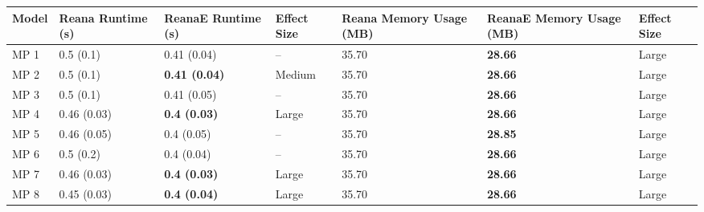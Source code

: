 \begin{tabular}{lllllll}
\toprule
Model & Reana Runtime (s) &    ReanaE Runtime (s) & Effect Size & Reana Memory Usage (MB) & ReanaE Memory Usage (MB) & Effect Size \\
\midrule
 MP 1 &         0.5 (0.1) &           0.41 (0.04) &          -- &                   35.70 &           \textbf{28.66} &       Large \\
 MP 2 &         0.5 (0.1) &  \textbf{0.41 (0.04)} &      Medium &                   35.70 &           \textbf{28.66} &       Large \\
 MP 3 &         0.5 (0.1) &           0.41 (0.05) &          -- &                   35.70 &           \textbf{28.66} &       Large \\
 MP 4 &       0.46 (0.03) &   \textbf{0.4 (0.03)} &       Large &                   35.70 &           \textbf{28.66} &       Large \\
 MP 5 &       0.46 (0.05) &            0.4 (0.05) &          -- &                   35.70 &           \textbf{28.85} &       Large \\
 MP 6 &         0.5 (0.2) &            0.4 (0.04) &          -- &                   35.70 &           \textbf{28.66} &       Large \\
 MP 7 &       0.46 (0.03) &   \textbf{0.4 (0.03)} &       Large &                   35.70 &           \textbf{28.66} &       Large \\
 MP 8 &       0.45 (0.03) &   \textbf{0.4 (0.04)} &       Large &                   35.70 &           \textbf{28.66} &       Large \\
\bottomrule
\end{tabular}
